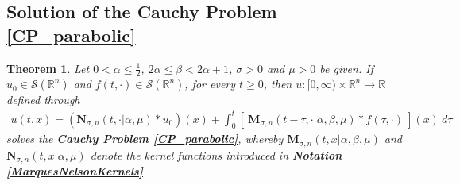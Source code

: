 \documentclass{amsart}
\newtheorem{theorem}{Theorem}[section]
\theoremstyle{definition}
\theoremstyle{remark}
\numberwithin{equation}{section}
\newcommand{\BR}{{\mathbb R}}
\begin{document}
\subsection{Solution of the Cauchy Problem \ref{CP_parabolic}}\label{SolutionCP_parabolic}


\begin{theorem}\label{Theorem1}
	Let $0<\alpha\leq \frac{1}{2}$, $2\alpha\leq \beta< 2\alpha+1$, $\sigma>0$ and $\mu>0$ 
	be given. 
	If $u_0\in \mathcal{S}(\mathbb{R}^n)$ and 
		$f(t,\cdot)\in \mathcal{S}(\mathbb{R}^n)$, for every $t\geq 0$,
		then $u: [0,\infty)\times \BR^n\longrightarrow \BR$ defined through \begin{eqnarray*}
			u(t,x)=\left({\bm N}_{\sigma,n}(t,\cdot|\alpha,\mu)*u_0\right)(x)+\int_{0}^t \left[~{\bm M}_{\sigma,n}(t-\tau,\cdot|\alpha,\beta,\mu)\ast f(\tau,\cdot)~\right](x)~d\tau
		\end{eqnarray*} solves the {\bf Cauchy Problem \ref{CP_parabolic}}, whereby ${\bm M}_{\sigma,n}(t,x|\alpha,\beta,\mu)$ and ${\bm N}_{\sigma,n}(t,x|\alpha,\mu)$ denote the kernel functions introduced in {\bf Notation \ref{MarquesNelsonKernels}}.
	\end{theorem} 
	
\end{document}
